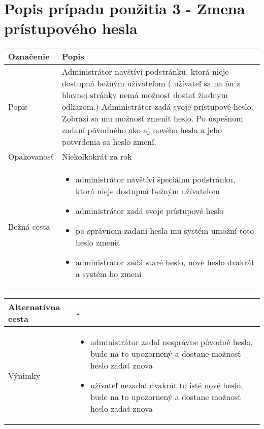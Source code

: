 \documentclass[12pt,a4paper]{report}
\begin{document}
\pagebreak
\section[Popis prípadu použitia 3 - Zmena prístupového hesla]{\rmfamily\bfseries
	Popis prípadu použitia 3 - Zmena prístupového hesla}
\begin{table}[h!]
	\centering
	\begin{tabular}{|>{\centering\arraybackslash}m{3in}|>{\centering\arraybackslash}m{3in}|}
		\hline
		\centering Označenie & Popis \\ [0ex]
		\hline
		Popis & Administrátor navštívi podstránku, ktorá nieje dostupná bežným užívateľom (
		užívateľ sa na ňu z hlavnej stránky nemá možnosť dostať žiadnym odkazom.) Administrátor
		zadá svoje prístupové heslo. Zobrazí sa mu možnosť zmeniť heslo. Po úspešnom zadaní pôvodného ako aj nového hesla a jeho potvrdenia sa heslo zmení.\\ [0ex]
		\hline
		Opakovanosť & Niekoľkokrát za rok \\ [0ex]
		\hline
		Bežná cesta & 	\begin{itemize}
			\item administrátor navštívi špeciálnu podstránku, ktorá nieje dostupná bežným užívateľom
			\item administrátor zadá svoje prístupové heslo
			\item po správnom zadaní hesla mu systém umožní toto heslo zmeniť
			\item administrátor zadá staré heslo, nové heslo dvakrát a systém ho zmení	
		\end{itemize} \\ [0ex]
		\hline
	\end{tabular}
\end{table}
\begin{table}[h!]
	\centering
	\begin{tabular}{|>{\centering\arraybackslash}m{3in}|>{\centering\arraybackslash}m{3in}|}
			\hline
			Alternatívna cesta & - \\ [0ex]
			\hline
			Výnimky &\begin{itemize}
				\item administrátor zadal nesprávne pôvodné heslo, bude na to upozornený a dostane možnosť heslo zadať znova
				\item užívateľ nezadal dvakrát to isté nové heslo, bude na to upozornený a dostane možnosť heslo zadať znova
			\end{itemize} \\ [0ex]
			\hline
	\end{tabular}
\end{table}
\end{document}
